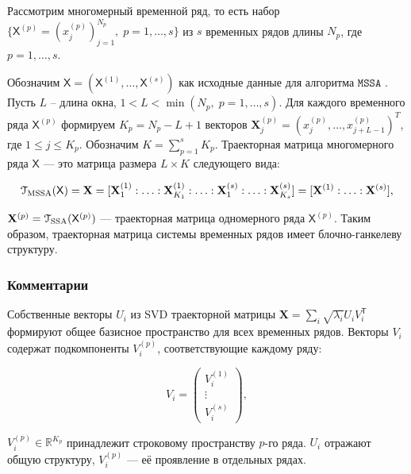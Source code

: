 \documentclass[12pt, specialist, subf
]{disser}
\theoremstyle{definition}
\newcommand{\MSSA}{\texttt{MSSA}}
\newcommand{\TS}{\mathsf{X}}
\begin{document}
Рассмотрим многомерный временной ряд, то есть набор $\{\TS^{(p)} = \left({x^{(p)}_{j}}\right) _{j=1}^{N_p}, \; p = 1, \ldots, s\}$ из $s$ временных рядов длины $N_p$, где $p = 1, \ldots, s$.

Обозначим $\TS = (\TS^{(1)}, \ldots, \TS^{(s)})$ как исходные данные для алгоритма $\MSSA$ \cite[Глава~4, Раздел~4.2]{ssa_with_R}. Пусть $L$ -- длина окна, $1 < L < \min(N_p, \; p = 1, \ldots, s)$. Для каждого временного ряда $\TS^{(p)}$ формируем $K_p = N_p - L + 1$ векторов $\mathbf{X}_j^{(p)} = (x_j^{(p)}, \ldots, x_{j+L-1}^{(p)})^T$, где $1 \leq j \leq K_p$. Обозначим $K = \sum_{p=1}^s K_p$. Траекторная матрица многомерного ряда $\TS$ — это матрица размера $L \times K$ следующего вида:

\[
	\EuScript{T}_{\text{MSSA}}(\TS) = \mathbf{X} = [\mathbf{X}_1^{(1)} : \ldots : \mathbf{X}_{K_1}^{(1)} : \ldots : \mathbf{X}_1^{(s)} : \ldots : \mathbf{X}_{K_s}^{(s)}] = [\mathbf{X}^{(1)} : \ldots : \mathbf{X}^{(s)}],
\]

$\mathbf{X}^{(p)} = \EuScript{T}_{\text{SSA}}(\TS^{(p)})$ — траекторная матрица одномерного ряда $\TS^{(p)}$. Таким образом, траекторная матрица системы временных рядов имеет блочно-ганкелеву структуру.




\subsubsection{Комментарии}


Собственные векторы $U_i$ из SVD траекторной матрицы $\mathbf{X} = \sum_i \sqrt{\lambda_i} U_i V_i^{\mathsf{T}}$ формируют общее базисное пространство для всех временных рядов. Векторы $V_i$ содержат подкомпоненты $V_i^{(p)}$, соответствующие каждому ряду:

\begin{equation*}
	V_i = \begin{pmatrix} V_i^{(1)} \\ \vdots \\ V_i^{(s)} \end{pmatrix},
\end{equation*}

$V_i^{(p)} \in \mathbb{R}^{K_p}$ принадлежит строковому пространству $p$-го ряда. $U_i$ отражают общую структуру, $V_i^{(p)}$ — её проявление в отдельных рядах.
\end{document}
